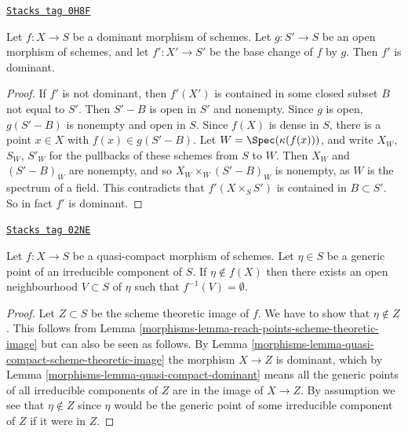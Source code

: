 \begin{lemma}
\label{morphisms-lemma-open-base-change-dominant}
\href{https://stacks.math.columbia.edu/tag/0H8F}{\texttt{Stacks tag 0H8F}}

Let $f : X \to S$ be a dominant morphism of schemes.
Let $g : S' \to S$ be an open morphism of schemes, and let $f' : X' \to S'$
be the base change of $f$ by $g$. Then $f'$ is dominant.
\end{lemma}

\begin{proof}
If $f'$ is not dominant, then $f'(X')$ is contained in some closed
subset $B$ not equal to $S'$. Then $S'-B$ is open in $S'$ and nonempty.
Since $g$ is open, $g(S'-B)$ is nonempty and open in $S$. Since $f(X)$
is dense in $S$, there is a point $x\in X$ with $f(x) \in g(S'-B)$.
Let $W = \Spec(\kappa (f(x)))$,
and write $X_W$, $S_W$, $S'_W$ for the pullbacks
of these schemes from $S$ to $W$. Then $X_W$ and $(S'-B)_W$ are nonempty,
and so $X_W \times_W (S'-B)_W$ is nonempty, as $W$ is the spectrum
of a field. This contradicts that $f'(X \times_S S')$ is contained
in $B \subset S'$. So in fact $f'$ is dominant.
\end{proof}

\begin{lemma}
\label{morphisms-lemma-quasi-compact-generic-point-not-in-image}
\href{https://stacks.math.columbia.edu/tag/02NE}{\texttt{Stacks tag 02NE}}

Let $f : X \to S$ be a quasi-compact morphism of schemes.
Let $\eta \in S$ be a generic point of an irreducible
component of $S$. If $\eta \not \in f(X)$ then there
exists an open neighbourhood $V \subset S$ of $\eta$
such that $f^{-1}(V) = \emptyset$.
\end{lemma}

\begin{proof}

Let $Z \subset S$ be the scheme theoretic image of $f$.
We have to show that $\eta \not \in Z$.
This follows from
Lemma \ref{morphisms-lemma-reach-points-scheme-theoretic-image}
but can also be seen as follows.
By Lemma \ref{morphisms-lemma-quasi-compact-scheme-theoretic-image}
the morphism $X \to Z$ is dominant, which by
Lemma \ref{morphisms-lemma-quasi-compact-dominant}
means all the generic points of all irreducible components of $Z$
are in the image of $X \to Z$. By assumption we see that
$\eta \not \in Z$ since $\eta$ would be the generic
point of some irreducible component of $Z$ if it were in $Z$.
\end{proof}

